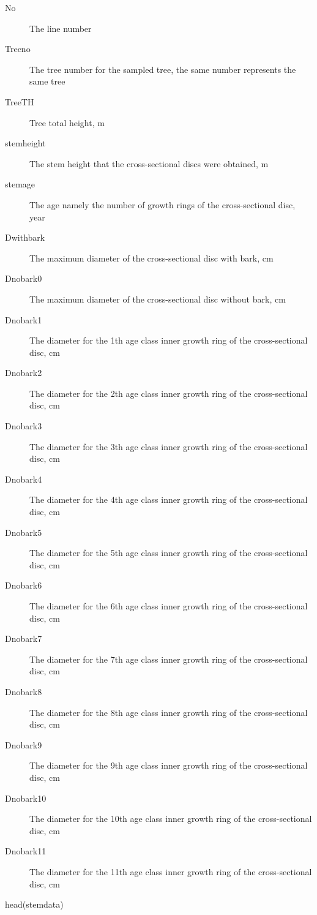 \documentclass[a4paper]{book}
\begin{document}
\begin{Format}
\begin{description}
\item[No] The line number
\item[Treeno] The tree number for the sampled tree, the same number represents the same tree
\item[TreeTH] Tree total height, m
\item[stemheight] The stem height that the cross-sectional discs were obtained, m
\item[stemage] The age namely the number of growth rings of the cross-sectional disc, year
\item[Dwithbark] The maximum diameter of the cross-sectional disc with bark, cm
\item[Dnobark0] The maximum diameter of the cross-sectional disc without bark, cm
\item[Dnobark1] The diameter for the 1th age class inner growth ring of the cross-sectional disc, cm
\item[Dnobark2] The diameter for the 2th age class inner growth ring of the cross-sectional disc, cm
\item[Dnobark3] The diameter for the 3th age class inner growth ring of the cross-sectional disc, cm
\item[Dnobark4] The diameter for the 4th age class inner growth ring of the cross-sectional disc, cm
\item[Dnobark5] The diameter for the 5th age class inner growth ring of the cross-sectional disc, cm
\item[Dnobark6] The diameter for the 6th age class inner growth ring of the cross-sectional disc, cm
\item[Dnobark7] The diameter for the 7th age class inner growth ring of the cross-sectional disc, cm
\item[Dnobark8] The diameter for the 8th age class inner growth ring of the cross-sectional disc, cm
\item[Dnobark9] The diameter for the 9th age class inner growth ring of the cross-sectional disc, cm
\item[Dnobark10] The diameter for the 10th age class inner growth ring of the cross-sectional disc, cm
\item[Dnobark11] The diameter for the 11th age class inner growth ring of the cross-sectional disc, cm

\end{description}

\end{Format}
%
\begin{Examples}
\begin{ExampleCode}
head(stemdata)
\end{ExampleCode}
\end{Examples}
\end{document}
